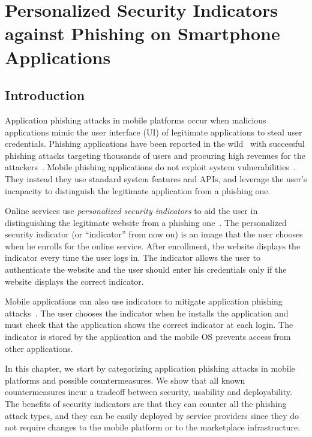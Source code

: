 \chapter[Personalized Indicators against Phishing on Smartphone Applications]{Personalized Security Indicators against Phishing on Smartphone Applications}
\label{chap:sp_phishing}

\newcommand{\secmodule}{Broker}
\newenvironment{myquote}{\list{}{\leftmargin=0.2in\rightmargin=0.2in}\item[]}{\endlist}

\section{Introduction}

Application phishing attacks in mobile platforms occur when malicious applications mimic the user interface (UI) of legitimate applications to steal user credentials.
Phishing applications have been reported in the wild~\cite{droid09, securelist, zhou12ndss} with successful phishing attacks targeting thousands of users and procuring high revenues for the attackers~\cite{forbes}.  Mobile phishing applications do not exploit system vulnerabilities~\cite{felt11w2sp}. They instead they use standard system features and APIs, and leverage the user's incapacity to distinguish the legitimate application from a phishing one.

Online services use \emph{personalized security indicators} to aid the user in
distinguishing the legitimate website from a phishing one~\cite{boa,vanguard}.
The personalized security indicator (or ``indicator'' from now on) is an image that the user
chooses when he enrolls for the online service. After enrollment, the website
displays the indicator every time the user logs in. The indicator allows the
user to authenticate the website and the user should enter his credentials only if the website displays the correct indicator.

Mobile applications can also use indicators to mitigate application phishing
attacks~\cite{zu-woot12, bianchi15sp}. The user chooses the indicator when he
installs the application and must check that the application shows the correct
indicator at each login. The indicator is stored by the application and the
mobile OS prevents access from other applications.

In this chapter, we start by categorizing application phishing attacks in mobile
platforms and possible countermeasures. We show that all known countermeasures incur a tradeoff between security, usability and deployability. The benefits of security indicators are that they can counter all the phishing attack types, and they can be easily deployed by service providers since they do not require changes to the mobile platform or to the marketplace infrastructure.

